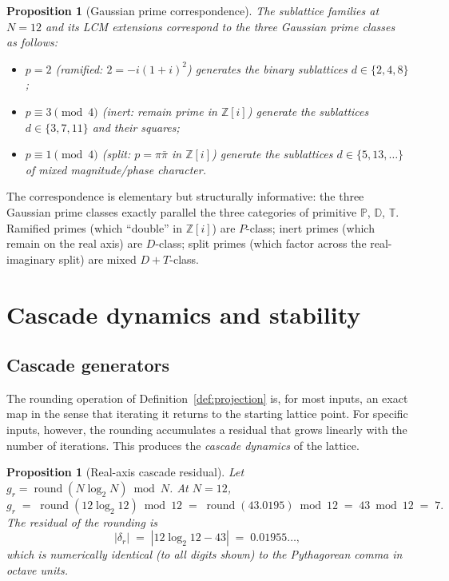 \documentclass[11pt,a4paper]{article}
\newtheorem{proposition}[theorem]{Proposition}
\theoremstyle{definition}
\theoremstyle{remark}
\newcommand{\Z}{\mathbb{Z}}
\newcommand{\PP}{\mathbb{P}}
\newcommand{\DD}{\mathbb{D}}
\newcommand{\TT}{\mathbb{T}}
\DeclareMathOperator{\round}{round}
\begin{document}
\begin{proposition}[Gaussian prime correspondence]\label{prop:gaussian}
The sublattice families at $N=12$ and its LCM extensions correspond to the three Gaussian prime classes as follows:
\begin{itemize}[leftmargin=*]
\item $p=2$ (ramified: $2=-i(1+i)^{2}$) generates the binary sublattices $d\in\{2,4,8\}$;
\item $p\equiv 3\pmod 4$ (inert: remain prime in $\Z[i]$) generate the sublattices $d\in\{3,7,11\}$ and their squares;
\item $p\equiv 1\pmod 4$ (split: $p=\pi\bar\pi$ in $\Z[i]$) generate the sublattices $d\in\{5,13,\ldots\}$ of mixed magnitude/phase character.
\end{itemize}
\end{proposition}

The correspondence is elementary but structurally informative: the three Gaussian prime classes exactly parallel the three categories of primitive $\PP$, $\DD$, $\TT$. Ramified primes (which ``double'' in $\Z[i]$) are $P$-class; inert primes (which remain on the real axis) are $D$-class; split primes (which factor across the real-imaginary split) are mixed $D{+}T$-class.

\section{Cascade dynamics and stability}\label{sec:cascade}

\subsection{Cascade generators}

The rounding operation of Definition~\ref{def:projection} is, for most inputs, an exact map in the sense that iterating it returns to the starting lattice point. For specific inputs, however, the rounding accumulates a residual that grows linearly with the number of iterations. This produces the \emph{cascade dynamics} of the lattice.

\begin{proposition}[Real-axis cascade residual]\label{prop:cascader}
Let $g_{r} = \round(N\log_{2}N)\bmod N$. At $N=12$,
\[
g_{r} \;=\; \round(12\log_{2}12)\bmod 12 \;=\; \round(43.0195)\bmod 12 \;=\; 43\bmod 12 \;=\; 7.
\]
The residual of the rounding is
\[
|\delta_{r}| \;=\; |12\log_{2}12 - 43| \;=\; 0.01955\ldots,
\]
which is numerically identical (to all digits shown) to the Pythagorean comma in octave units.
\end{proposition}
\end{document}
